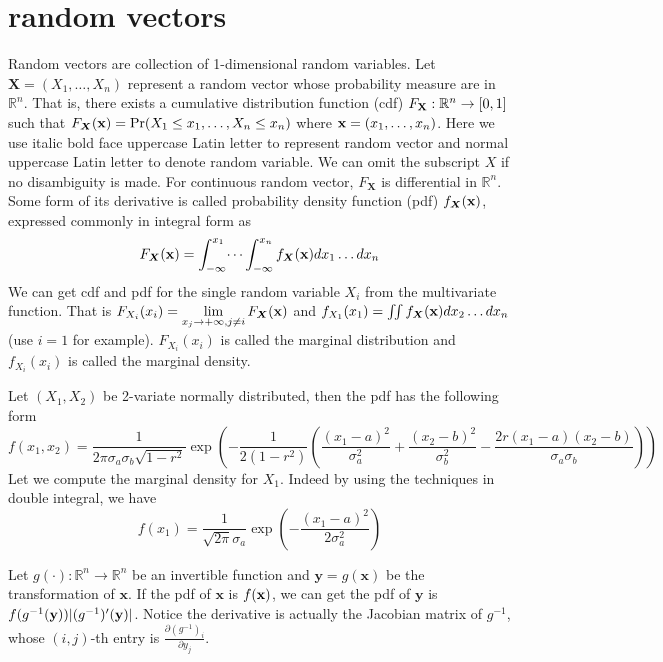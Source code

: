 \section{random vectors}
Random vectors are collection of 1-dimensional random variables. Let $\bm{X} = (X_1, \dots, X_n)$ 
represent a random vector whose probability measure are in $\mathbb{R}^n$.
That is, there exists a cumulative distribution function (cdf) $F_{\mathbf{X}}: \mathbb{R}^n \rightarrow [0,1]$ 
such that $F_{\bm{X}}(\mathbf{x}) = \Pr(X_1 \leq x_1, \dots, X_n \leq x_n)$ where $ \mathbf{x} = (x_1, \dots, x_n)$.
Here we use italic bold face uppercase Latin letter to represent random vector and normal uppercase Latin letter to denote random variable. We can omit the subscript $X$ if no disambiguity is made. For continuous random vector, $F_{\bm{X}}$ is differential in $\mathbb{R}^n$. Some form of its derivative is called probability density function (pdf) $f_{\bm{X}}(\mathbf{x})$, expressed commonly in integral form as
\begin{equation}
F_{\bm{X}}(\mathbf{x}) = \int_{-\infty}^{x_1}\dots\int_{-\infty}^{x_n} f_{\bm{X}}(\mathbf{x}) dx_1 \dots dx_n
\end{equation}
We can get cdf and pdf for the single random variable $X_i$ from the multivariate function. That is
$ F_{X_i}(x_i) = \displaystyle\lim_{x_j \to +\infty, j\neq i} F_{\bm{X}}(\mathbf{x})$ and 
$ f_{X_1}(x_1) = \iint f_{\bm{X}}(\mathbf{x})dx_2 \dots d x_n$ (use $i=1$ for example).
$F_{X_i}(x_i)$ is called the marginal distribution and $f_{X_i}(x_i)$ is called the marginal density.

\begin{example}\label{ex:g2}
	Let $(X_1, X_2)$ be 2-variate normally distributed, then the pdf has the following form
\begin{equation}
f(x_1, x_2) = \frac{1}{2\pi \sigma_a \sigma_b \sqrt{1-r^2}} \exp(-\frac{1}{2(1-r^2)} \left(\frac{(x_1-a)^2}{\sigma_a^2} + \frac{(x_2-b)^2}{\sigma_b^2} -\frac{2r(x_1-a)(x_2-b)}{\sigma_a \sigma_b}\right)) 
\end{equation}
Let we compute the marginal density for $X_1$. Indeed by using the techniques in double integral, we have
\begin{equation}
f(x_1) = \frac{1}{\sqrt{2\pi}\sigma_a} \exp(-\frac{(x_1-a)^2}{2\sigma_a^2})
\end{equation}

\end{example}
Let $g(\cdot): \mathbb{R}^n \to \mathbb{R}^n$ be an invertible function and $\bm{y} = g(\bm{x})$ be the transformation of $\bm{x}$.
If the pdf of $\bm{x}$ is $f(\mathbf{x})$, we can get the pdf of $\bm{y}$ is $f(g^{-1}(\mathbf{y})) \lvert(g^{-1})'(\mathbf{y})\rvert$. Notice the derivative is actually the Jacobian matrix of $g^{-1}$, whose $(i,j)$-th entry is $\frac{\partial (g^{-1})_i}{\partial y_j}$.

